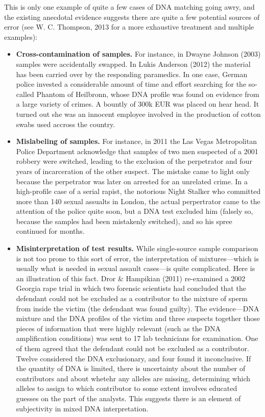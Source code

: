 \documentclass[
  10pt,
  dvipsnames,enabledeprecatedfontcommands]{scrartcl}
\begin{document}
This is only one example of quite a few cases of DNA matching going
awry, and the existing anecdotal evidence suggests there are quite a few
potential sources of error (see W. C. Thompson, 2013 for a more
exhaustive treatment and multiple examples):

\begin{itemize}
\item
  \textbf{Cross-contamination of samples.} For instance, in Dwayne
  Johnson (2003) samples were accidentally swapped. In Lukis Anderson
  (2012) the material has been carried over by the responding
  paramedics. In one case, German police invested a considerable amount
  of time and effort searching for the so-called Phantom of Heilbronn,
  whose DNA profile was found on evidence from a large variety of
  crimes. A bountly of 300k EUR was placed on hear head. It turned out
  she was an innocent employee involved in the production of cotton
  swabs used accross the country.
\item
  \textbf{Mislabeling of samples.} For instance, in 2011 the Las Vegas
  Metropolitan Police Department acknowledge that samples of two men
  suspected of a 2001 robbery were switched, leading to the exclusion of
  the perpetrator and four years of incarceration of the other suspect.
  The mistake came to light only because the perpetrator was later on
  arrested for an unrelated crime. In a high-profile case of a serial
  rapist, the notorious Night Stalker who committed more than 140 sexual
  assualts in London, the actual perpertrator came to the attention of
  the police quite soon, but a DNA test excluded him (falsely so,
  because the samples had been mistakenly switched), and so his spree
  continued for months.
\item
  \textbf{Misinterpretation of test results.} While single-source sample
  comparison is not too prone to this sort of error, the interpretation
  of mixtures---which is usually what is needed in sexual assault
  cases---is quite complicated. Here is an illustration of this fact.
  Dror \& Hampikian (2011) re-examined a 2002 Georgia rape trial in
  which two forensic scientists had concluded that the defendant could
  not be excluded as a contributor to the mixture of sperm from inside
  the victim (the defendant was found guilty). The evidence---DNA
  mixture and the DNA profiles of the victim and three suspects together
  those pieces of information that were highly relevant (such as the DNA
  amplification conditions) was sent to 17 lab technicians for
  examination. One of them agreed that the defendant could not be
  excluded as a contributor. Twelve considered the DNA exclusionary, and
  four found it inconclusive. If the quantity of DNA is limited, there
  is uncertainty about the number of contributors and about whetehr any
  alleles are missing, determining which alleles to assign to which
  contributor to some extent involves educated guesses on the part of
  the analysts. This suggests there is an element of subjectivity in
  mixed DNA interpretation.
\end{itemize}
\end{document}
